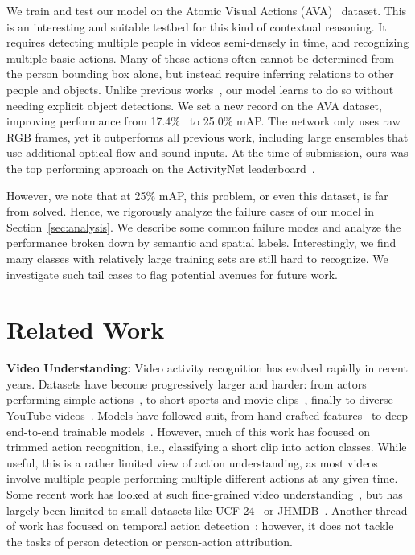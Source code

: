 \documentclass[10pt,twocolumn,letterpaper]{article}
\begin{document}
We train and test our model on the Atomic Visual Actions
(AVA)~\cite{gu2018ava} dataset. This
is an interesting and suitable testbed for this kind of contextual reasoning. It requires detecting multiple people in videos semi-densely in time, and recognizing multiple basic actions. Many of these actions often cannot be determined from the person bounding box alone, but instead require inferring relations
to other people and objects. Unlike previous works~\cite{baradel2018object},
our model learns to do so without needing explicit object detections.
We set a new record on the 
AVA dataset, improving performance from 17.4\%~\cite{sun2018arcn} to 25.0\% mAP. The network 
only uses raw RGB frames, yet it
outperforms all previous work, including large ensembles that use additional optical flow and sound inputs. At the time of submission, ours was the top performing approach on the ActivityNet leaderboard~\cite{ava_leaderboard}. 

However, we note that at 25\% mAP, this problem, or even this dataset, is far from solved.
Hence, we rigorously analyze the failure cases of our model in Section~\ref{sec:analysis}. We 
describe some common failure modes and analyze the performance broken down by semantic and spatial labels. 
Interestingly, we find many classes with relatively large training sets are still hard to recognize. 
We investigate such tail cases to flag potential avenues for future work.

 \section{Related Work}

{\noindent \bf Video Understanding:} Video activity recognition has
evolved rapidly in recent years. Datasets have become progressively
larger and harder: from actors performing simple
actions~\cite{gorelick2007weizmann,schuldt2004kth}, to short sports
and movie clips~\cite{ucf101,hmdb51}, finally to diverse YouTube
videos~\cite{kay2017kinetics,youtube8M}. Models have followed suit, from
hand-crafted features~\cite{laptev2005space,IDT_Wang_13} to deep
end-to-end trainable
models~\cite{Karpathy_14,WangL_16a,carreira2017quo,xie2017rethinking,wang2017non}.
However, much of this work has focused on trimmed action recognition,
i.e., classifying a short clip into action classes. While useful, this
is a rather limited view of action understanding, as most videos
involve multiple people  performing multiple different actions at any
given time.  Some recent work has looked at such fine-grained video
understanding~\cite{singh2017online,hou2017tube,duarte2018videocapsule,kalogeiton2017action},
but has largely been limited to small datasets like
UCF-24~\cite{ucf101,singh2017online} or JHMDB~\cite{Jhuang2013JHMDB}.
Another thread of work has focused on temporal action
detection~\cite{charades,sigurdsson2017asynchronous,xu2017rc3d};
however, it does not tackle the tasks of person detection or person-action
attribution.
\end{document}
